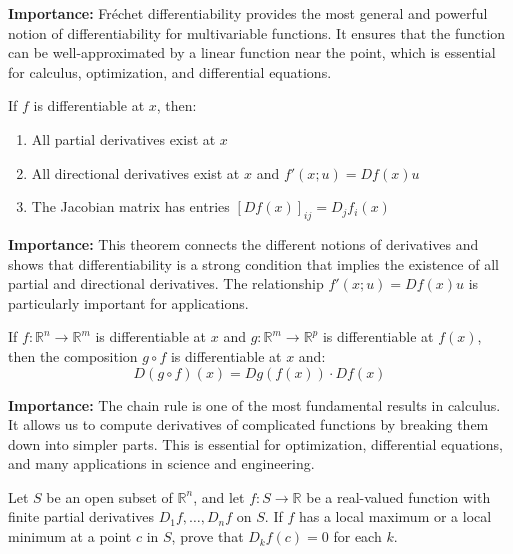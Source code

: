 \noindent\textbf{Importance:} Fréchet differentiability provides the most general and powerful notion of differentiability for multivariable functions. It ensures that the function can be well-approximated by a linear function near the point, which is essential for calculus, optimization, and differential equations.



\begin{theorem}
If $f$ is differentiable at $x$, then:
\begin{enumerate}[label=(\alph*)]
\item All partial derivatives exist at $x$
\item All directional derivatives exist at $x$ and $f'(x; u) = Df(x)u$
\item The Jacobian matrix has entries $[Df(x)]_{ij} = D_j f_i(x)$
\end{enumerate}
\end{theorem}

\noindent\textbf{Importance:} This theorem connects the different notions of derivatives and shows that differentiability is a strong condition that implies the existence of all partial and directional derivatives. The relationship $f'(x; u) = Df(x)u$ is particularly important for applications.



\begin{theorem}
If $f: \mathbb{R}^n \to \mathbb{R}^m$ is differentiable at $x$ and $g: \mathbb{R}^m \to \mathbb{R}^p$ is differentiable at $f(x)$, then the composition $g \circ f$ is differentiable at $x$ and:
\[D(g \circ f)(x) = Dg(f(x)) \cdot Df(x)\]
\end{theorem}

\noindent\textbf{Importance:} The chain rule is one of the most fundamental results in calculus. It allows us to compute derivatives of complicated functions by breaking them down into simpler parts. This is essential for optimization, differential equations, and many applications in science and engineering.





\begin{problembox}
\begin{problemstatement}
Let \( S \) be an open subset of \( \mathbb{R}^n \), and let \( f: S \to \mathbb{R} \) be a real-valued function with finite partial derivatives \( D_1f, \ldots, D_nf \) on \( S \). If \( f \) has a local maximum or a local minimum at a point \( c \) in \( S \), prove that \( D_kf(c) = 0 \) for each \( k \).
\end{problemstatement}
\end{problembox}

